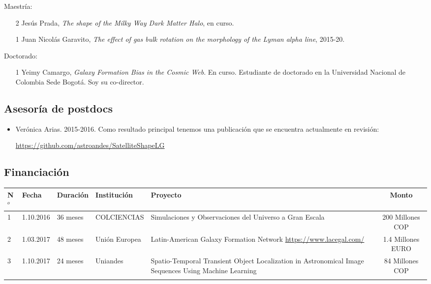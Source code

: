 \documentclass{article}
\begin{document}
Maestr\'ia:
\begin{itemize}
\item [2] Jes\'us Prada, \emph{The shape of the Milky Way Dark Matter
  Halo}, en curso.
\item [1] Juan Nicol\'as Garavito, \emph{The effect of gas bulk rotation
  on the morphology of the Lyman alpha line}, 2015-20.
\end{itemize}

Doctorado:
\begin{itemize}
\item [1] Yeimy Camargo, \emph{Galaxy Formation Bias in the Cosmic
  Web}. En curso. Estudiante de doctorado en la Universidad Nacional de Colombia
  Sede Bogot\'a. Soy su co-director.
\end{itemize}

\subsection{Asesor\'ia de postdocs}

\begin{itemize}
\item Ver\'onica Arias. 2015-2016. Como resultado principal tenemos
  una publicaci\'on que se encuentra actualmente en revisi\'on:

\url{https://github.com/astroandes/SatelliteShapeLG}

\end{itemize}

\subsection{Financiaci\'on}
\begin{tabular}{l l l p{2.4cm} p{4.0cm} c}\hline
N$^{o}$ & Fecha & Duraci\'on & Instituci\'on & Proyecto & Monto \\\hline
1 & 1.10.2016 & 36 meses & COLCIENCIAS & Simulaciones y Observaciones del Universo a Gran Escala & 200 Millones COP\\\hline
2 & 1.03.2017 & 48 meses & Uni\'on Europea & Latin-American Galaxy Formation Network \url{https://www.lacegal.com/} & 1.4 Millones EURO \\\hline
3 & 1.10.2017 & 24 meses & Uniandes & 
Spatio-Temporal Transient Object Localization in Astronomical Image
Sequences Using Machine Learning & 84 Millones COP \\
\\\hline 
\end{tabular}
\end{document}

